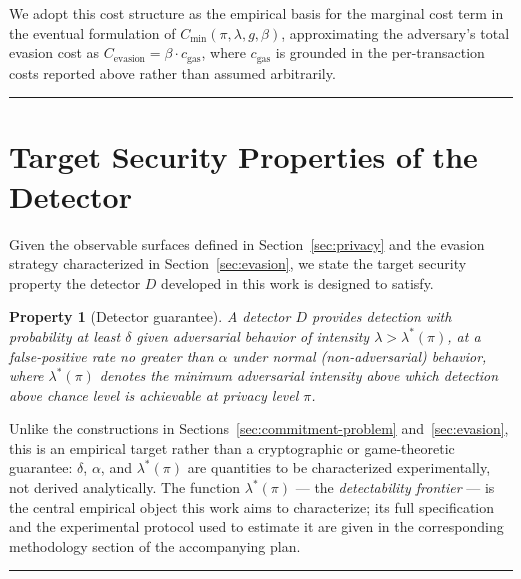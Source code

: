 \documentclass[journal,onecolumn,11pt]{IEEEtran}
\newtheorem{property}{Property}
\begin{document}
We adopt this cost structure as the empirical basis for the marginal cost
term in the eventual formulation of $C_{\min}(\pi, \lambda, g, \beta)$,
approximating the adversary's total evasion cost as
$C_{\text{evasion}} = \beta \cdot c_{\text{gas}}$, where $c_{\text{gas}}$ is
grounded in the per-transaction costs reported above rather than assumed
arbitrarily.

\bigskip
\hrule
\bigskip

\section{Target Security Properties of the Detector}
\label{sec:detector-properties}

Given the observable surfaces defined in Section~\ref{sec:privacy} and the
evasion strategy characterized in Section~\ref{sec:evasion}, we state the
target security property the detector $D$ developed in this work is designed
to satisfy.

\begin{property}[Detector guarantee]
\label{prop:detector-guarantee}
A detector $D$ provides detection with probability at least $\delta$ given
adversarial behavior of intensity $\lambda > \lambda^*(\pi)$, at a
false-positive rate no greater than $\alpha$ under normal (non-adversarial)
behavior, where $\lambda^*(\pi)$ denotes the minimum adversarial intensity
above which detection above chance level is achievable at privacy level
$\pi$.
\end{property}

Unlike the constructions in Sections~\ref{sec:commitment-problem}
and~\ref{sec:evasion}, this is an empirical target rather than a
cryptographic or game-theoretic guarantee: $\delta$, $\alpha$, and
$\lambda^*(\pi)$ are quantities to be characterized experimentally, not
derived analytically. The function $\lambda^*(\pi)$ --- the
\emph{detectability frontier} --- is the central empirical object this work
aims to characterize; its full specification and the experimental protocol
used to estimate it are given in the corresponding methodology section of
the accompanying plan.


\bigskip
\hrule
\bigskip

\end{document}
